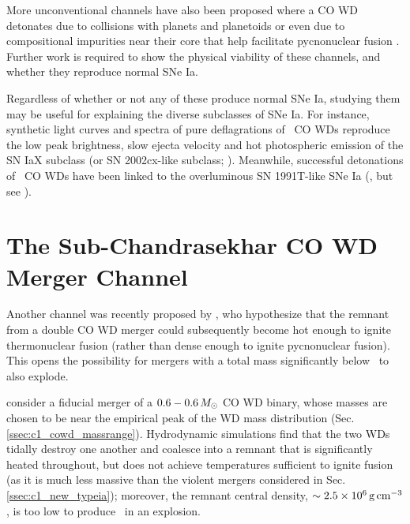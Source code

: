 More unconventional channels have also been proposed where a CO WD detonates due to collisions with planets and planetoids \citep{distfg15} or even due to compositional impurities near their core that help facilitate pycnonuclear fusion \citep{chio+15}.  Further work is required to show the physical viability of these channels, and whether they reproduce normal SNe Ia.  

Regardless of whether or not any of these produce normal SNe Ia, studying them may be useful for explaining the diverse subclasses of SNe Ia.  For instance, synthetic light curves and spectra of pure deflagrations of \Mch\ CO WDs \citep{phil+07, krom+13, fink+14} reproduce the low peak brightness, slow ejecta velocity and hot photospheric emission of the SN IaX subclass (or SN 2002cx-like subclass; \citealt{li+02, fole+13}).  Meanwhile, successful detonations of \Mch\ CO WDs have been linked to the overluminous SN 1991T-like SNe Ia (\citealt{fishj15}, but see \citealt{seit+16}).


\section{The Sub-Chandrasekhar CO WD Merger Channel}
\label{sec:c1_vkchannel}

Another channel was recently proposed by \citeal{vkercj10}, who hypothesize that the remnant from a double CO WD merger could subsequently become hot enough to ignite thermonuclear fusion (rather than dense enough to ignite pycnonuclear fusion).  This opens the possibility for mergers with a total mass significantly below \Mch\ to also explode.

\citeal{vkercj10} consider a fiducial merger of a $0.6-0.6\,\Msun$ CO WD binary, whose masses are chosen to be near the empirical peak of the WD mass distribution (Sec. \ref{ssec:c1_cowd_massrange}).  Hydrodynamic simulations \citep{loreig09} find that the two WDs tidally destroy one another and coalesce into a remnant that is significantly heated throughout, but does not achieve temperatures sufficient to ignite fusion (as it is much less massive than the violent mergers considered in Sec. \ref{ssec:c1_new_typeia}); moreover, the remnant central density, $\sim2.5\times10^6\,\gcc$, is too low to produce \Ni\ in an explosion.  

